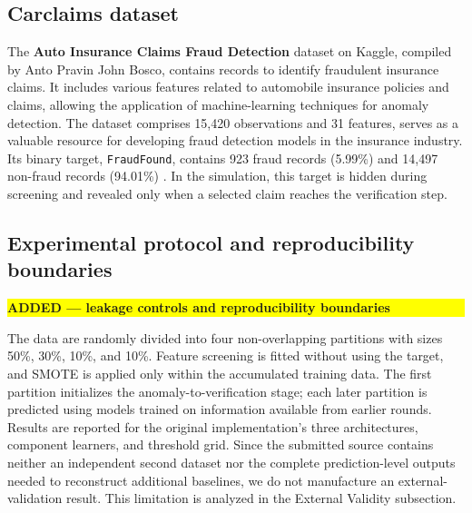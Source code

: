 \documentclass[12pt]{article}
\newcommand{\revmark}[1]{\par\noindent\colorbox{yellow}{%
  \parbox{\dimexpr\linewidth-2\fboxsep}{\raggedright\strut\textbf{#1}}}%
  \par\smallskip}
\begin{document}
\subsection*{Carclaims dataset}
The \textbf{\small Auto Insurance Claims Fraud Detection} dataset
on Kaggle, compiled by Anto Pravin John Bosco, contains records to
identify fraudulent insurance claims. It includes various features
related to automobile insurance policies and claims, allowing the
application of machine-learning techniques for anomaly detection.
The dataset comprises 15,420 observations and 31 features,
serves as a valuable resource for developing fraud detection
models in the insurance industry. Its binary target, \texttt{FraudFound},
contains 923 fraud records (5.99\%) and 14,497 non-fraud records (94.01\%)
\cite{dataset}. In the simulation, this target is hidden during screening and
revealed only when a selected claim reaches the verification step.

\subsection*{Experimental protocol and reproducibility boundaries}
\revmark{ADDED --- leakage controls and reproducibility boundaries}
The data are randomly divided into four non-overlapping partitions with sizes
50\%, 30\%, 10\%, and 10\%. Feature screening is fitted without using the
target, and SMOTE is applied only within the accumulated training data. The
first partition initializes the anomaly-to-verification stage; each later
partition is predicted using models trained on information available from
earlier rounds. Results are reported for the original implementation's three
architectures, component learners, and threshold grid. Since the submitted
source contains neither an independent second dataset nor the complete
prediction-level outputs needed to reconstruct additional baselines, we do not
manufacture an external-validation result. This limitation is analyzed in the
External Validity subsection.
\end{document}
